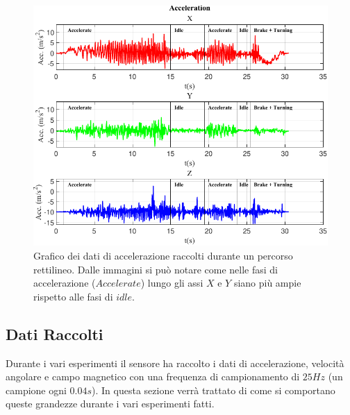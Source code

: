 \documentclass[class=article]{standalone}
\begin{document}
	\begin{center}
		\begin{figure}[h]
			\centering\includegraphics[width=.9\textwidth]{img/Acc LungaF.pdf}
			\caption[]{Grafico dei dati di accelerazione raccolti durante un percorso rettilineo. Dalle immagini si può notare come nelle fasi di accelerazione (\(Accelerate\))  lungo gli assi \(X\) e \(Y\) siano più ampie rispetto alle fasi di \(idle\).}
			\label{fig:AccLunga}
		\end{figure}
	\end{center}
	
	\subsection{Dati Raccolti}
	Durante i vari esperimenti il sensore ha raccolto i dati di accelerazione, velocità angolare e campo magnetico con una frequenza di campionamento di \(25Hz\) (un campione ogni \(0.04s\)). In questa sezione verrà trattato di come si comportano queste grandezze durante i vari esperimenti fatti.
	
\end{document}
